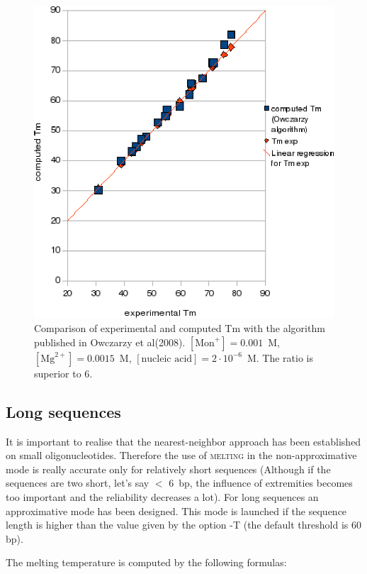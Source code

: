 \documentclass{article}
\begin{document}
\begin{figure}[H]
\includegraphics{Owczarzy1.eps}
\caption{Comparison of experimental and computed Tm with the algorithm published
in Owczarzy et al(2008). $[\mbox{Mon}^+] = 0.001$~M, $[\mbox{Mg}^{2+}] = 0.0015$~M, $[\mbox{nucleic acid}] =
2\cdot{}10^{-6}$~M. The ratio is superior to 6.}
\end{figure}
    
\subsection{Long sequences }  
  It is important to realise that the nearest-neighbor approach 
has been established  on small oligonucleotides. Therefore the use of \textsc{melting} 
in the non-approximative  mode is really accurate only for relatively short 
sequences (Although if the sequences are two short, let's say $<$ 6~bp, the 
influence of extremities becomes too important and the  reliability decreases 
a lot). For long sequences an approximative mode has been designed. This mode is 
launched if the sequence length is higher than the value 
given by the option -T (the default threshold is 60 bp).
 
The melting temperature is computed by the following formulas:   
\end{document}
